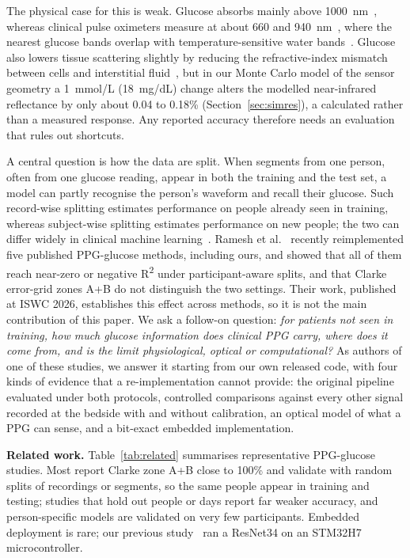 \documentclass[11pt]{article}
\newcommand{\RR}{R\textsuperscript{2}}
\newcommand{\mgdl}{mg/dL}
\begin{document}
The physical case for this is weak. Glucose absorbs mainly above 1000~nm~\citep{amerov2004}, whereas clinical pulse oximeters measure at about 660 and 940~nm~\citep{jubran2015}, where the nearest glucose bands overlap with temperature-sensitive water bands~\citep{golic2003}. Glucose also lowers tissue scattering slightly by reducing the refractive-index mismatch between cells and interstitial fluid~\citep{kohl1994,larin2003}, but in our Monte Carlo model of the sensor geometry a 1~mmol/L (18~\mgdl{}) change alters the modelled near-infrared reflectance by only about 0.04 to 0.18\% (Section~\ref{sec:simres}), a calculated rather than a measured response. Any reported accuracy therefore needs an evaluation that rules out shortcuts.

A central question is how the data are split. When segments from one person, often from one glucose reading, appear in both the training and the test set, a model can partly recognise the person's waveform and recall their glucose. Such record-wise splitting estimates performance on people already seen in training, whereas subject-wise splitting estimates performance on new people; the two can differ widely in clinical machine learning~\citep{saeb2017,kapoor2023}. Ramesh et al.~\citep{ramesh2026} recently reimplemented five published PPG-glucose methods, including ours, and showed that all of them reach near-zero or negative \RR{} under participant-aware splits, and that Clarke error-grid zones A+B do not distinguish the two settings. Their work, published at ISWC 2026, establishes this effect across methods, so it is not the main contribution of this paper. We ask a follow-on question: \emph{for patients not seen in training, how much glucose information does clinical PPG carry, where does it come from, and is the limit physiological, optical or computational?} As authors of one of these studies, we answer it starting from our own released code, with four kinds of evidence that a re-implementation cannot provide: the original pipeline evaluated under both protocols, controlled comparisons against every other signal recorded at the bedside with and without calibration, an optical model of what a PPG can sense, and a bit-exact embedded implementation.

\noindent\textbf{Related work.} Table~\ref{tab:related} summarises representative PPG-glucose studies. Most report Clarke zone A+B close to 100\% and validate with random splits of recordings or segments, so the same people appear in training and testing; studies that hold out people or days report far weaker accuracy, and person-specific models are validated on very few participants. Embedded deployment is rare; our previous study~\citep{zeynali2025} ran a ResNet34 on an STM32H7 microcontroller.
\end{document}
